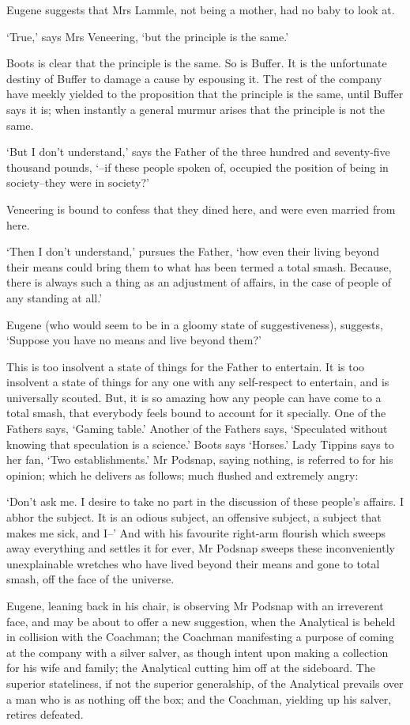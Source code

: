 Eugene suggests that Mrs Lammle, not being a mother, had no baby to look
at.

‘True,’ says Mrs Veneering, ‘but the principle is the same.’

Boots is clear that the principle is the same. So is Buffer. It is the
unfortunate destiny of Buffer to damage a cause by espousing it. The
rest of the company have meekly yielded to the proposition that the
principle is the same, until Buffer says it is; when instantly a general
murmur arises that the principle is not the same.

‘But I don’t understand,’ says the Father of the three hundred and
seventy-five thousand pounds, ‘--if these people spoken of, occupied the
position of being in society--they were in society?’

Veneering is bound to confess that they dined here, and were even
married from here.

‘Then I don’t understand,’ pursues the Father, ‘how even their living
beyond their means could bring them to what has been termed a total
smash. Because, there is always such a thing as an adjustment of
affairs, in the case of people of any standing at all.’

Eugene (who would seem to be in a gloomy state of suggestiveness),
suggests, ‘Suppose you have no means and live beyond them?’

This is too insolvent a state of things for the Father to entertain. It
is too insolvent a state of things for any one with any self-respect
to entertain, and is universally scouted. But, it is so amazing how any
people can have come to a total smash, that everybody feels bound to
account for it specially. One of the Fathers says, ‘Gaming table.’
Another of the Fathers says, ‘Speculated without knowing that
speculation is a science.’ Boots says ‘Horses.’ Lady Tippins says to her
fan, ‘Two establishments.’ Mr Podsnap, saying nothing, is referred
to for his opinion; which he delivers as follows; much flushed and
extremely angry:

‘Don’t ask me. I desire to take no part in the discussion of these
people’s affairs. I abhor the subject. It is an odious subject, an
offensive subject, a subject that makes me sick, and I--’ And with his
favourite right-arm flourish which sweeps away everything and settles it
for ever, Mr Podsnap sweeps these inconveniently unexplainable wretches
who have lived beyond their means and gone to total smash, off the face
of the universe.

Eugene, leaning back in his chair, is observing Mr Podsnap with an
irreverent face, and may be about to offer a new suggestion, when
the Analytical is beheld in collision with the Coachman; the Coachman
manifesting a purpose of coming at the company with a silver salver,
as though intent upon making a collection for his wife and family; the
Analytical cutting him off at the sideboard. The superior stateliness,
if not the superior generalship, of the Analytical prevails over a man
who is as nothing off the box; and the Coachman, yielding up his salver,
retires defeated.


